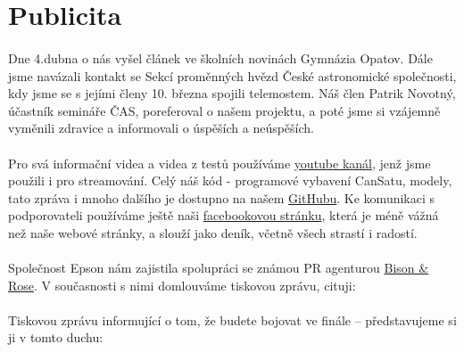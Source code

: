 \documentclass[a4paper]{report}
\begin{document}
\section{Publicita}
\paragraph{} Dne 4.dubna o nás vyšel článek ve školních novinách Gymnázia Opatov. Dále jsme navázali kontakt se Sekcí proměnných hvězd České astronomické společnosti, kdy jsme se s jejími členy 10. března spojili telemostem. Náš člen Patrik Novotný, účastník semináře ČAS, poreferoval o našem projektu, a poté jsme si vzájemně vyměnili zdravice a informovali o úspěších a neúspěších.
\paragraph{} Pro svá informační videa a videa z testů používáme \href{https://www.youtube.com/channel/UCbrLBa4NokHmF9CiW5-RHXA}{youtube kanál}, jenž jsme použili i pro streamování. Celý náš kód - programové vybavení CanSatu, modely, tato zpráva i mnoho dalšího je  dostupno na našem \href{https://github.com/suchanekj/CanSatGOSA}{GitHubu}. Ke komunikaci s podporovateli používáme ještě naši \href{https://www.facebook.com/GOSA-Gymn\%C3\%A1zium-Opatov-Space-Agency-1657994580942593/?ref=page_internal}{facebookovou stránku}, která je méně vážná než naše webové stránky, a slouží jako deník, včetně všech strastí i radostí.
\paragraph{} Společnost Epson nám zajistila spolupráci se známou PR agenturou \href{http://bisonrose.cz}{Bison \& Rose}. V současnosti s nimi domlouváme tiskovou zprávu, cituji:
\paragraph{} Tiskovou zprávu informující o tom, že budete bojovat ve finále – představujeme si ji v tomto duchu:
\end{document}
